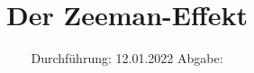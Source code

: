 

\subject{V61}
\title{Der Zeeman-Effekt}
\date{%
  Durchführung: 12.01.2022
  \hspace{3em}
  Abgabe: 
}



\maketitle
\thispagestyle{empty}
\tableofcontents
\newpage







\printbibliography{}


